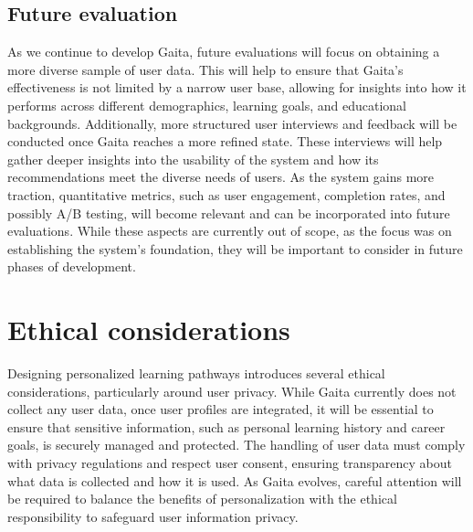 \subsection{Future evaluation}

As we continue to develop Gaita, future evaluations will focus on obtaining a more diverse sample of user data. This will help to ensure that Gaita’s effectiveness is not limited by a narrow user base, allowing for insights into how it performs across different demographics, learning goals, and educational backgrounds. Additionally, more structured user interviews and feedback will be conducted once Gaita reaches a more refined state. These interviews will help gather deeper insights into the usability of the system and how its recommendations meet the diverse needs of users. As the system gains more traction, quantitative metrics, such as user engagement, completion rates, and possibly A/B testing, will become relevant and can be incorporated into future evaluations. While these aspects are currently out of scope, as the focus was on establishing the system’s foundation, they will be important to consider in future phases of development.

\section{Ethical considerations}
Designing personalized learning pathways introduces several ethical considerations, particularly around user privacy. While Gaita currently does not collect any user data, once user profiles are integrated, it will be essential to ensure that sensitive information, such as personal learning history and career goals, is securely managed and protected. The handling of user data must comply with privacy regulations and respect user consent, ensuring transparency about what data is collected and how it is used. As Gaita evolves, careful attention will be required to balance the benefits of personalization with the ethical responsibility to safeguard user information privacy. 